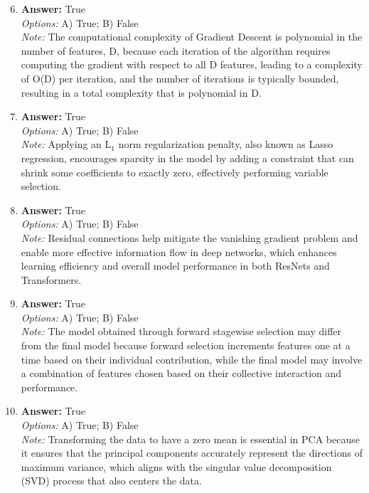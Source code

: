 \documentclass[12pt]{article}
\begin{document}
\begin{enumerate}[label=\arabic*.]
\setcounter{enumi}{5}
\item \textbf{Answer:} True
\\ \textit{Options:} A) True; B) False
\\ \textit{Note:} The computational complexity of Gradient Descent is polynomial in the number of features, D, because each iteration of the algorithm requires computing the gradient with respect to all D features, leading to a complexity of O(D) per iteration, and the number of iterations is typically bounded, resulting in a total complexity that is polynomial in D.
\item \textbf{Answer:} True
\\ \textit{Options:} A) True; B) False
\\ \textit{Note:} Applying an L$_{1}$ norm regularization penalty, also known as Lasso regression, encourages sparsity in the model by adding a constraint that can shrink some coefficients to exactly zero, effectively performing variable selection.
\item \textbf{Answer:} True
\\ \textit{Options:} A) True; B) False
\\ \textit{Note:} Residual connections help mitigate the vanishing gradient problem and enable more effective information flow in deep networks, which enhances learning efficiency and overall model performance in both ResNets and Transformers.
\item \textbf{Answer:} True
\\ \textit{Options:} A) True; B) False
\\ \textit{Note:} The model obtained through forward stagewise selection may differ from the final model because forward selection increments features one at a time based on their individual contribution, while the final model may involve a combination of features chosen based on their collective interaction and performance.
\item \textbf{Answer:} True
\\ \textit{Options:} A) True; B) False
\\ \textit{Note:} Transforming the data to have a zero mean is essential in PCA because it ensures that the principal components accurately represent the directions of maximum variance, which aligns with the singular value decomposition (SVD) process that also centers the data.
\end{enumerate}
\end{document}
